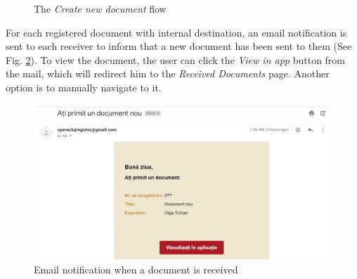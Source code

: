 \begin{figure}[ht]
    \centering
    \qquad
    \caption{The \textit{Create new document} flow}
    \label{createDocument}
\end{figure}

For each registered document with internal destination, an email notification is sent to each receiver to inform that a new document has been sent to them (See Fig. \ref{receivedEmail}). To view the document, the user can click the \textit{View in app} button from the mail, which will redirect him to the \textit{Received Documents} page. Another option is to manually navigate to it.

\begin{figure}[H]
    \centering
    \includegraphics[width=5.5in]{images/app/document_received_mail}
    \caption{Email notification when a document is received}
    \label{receivedEmail}
\end{figure}


